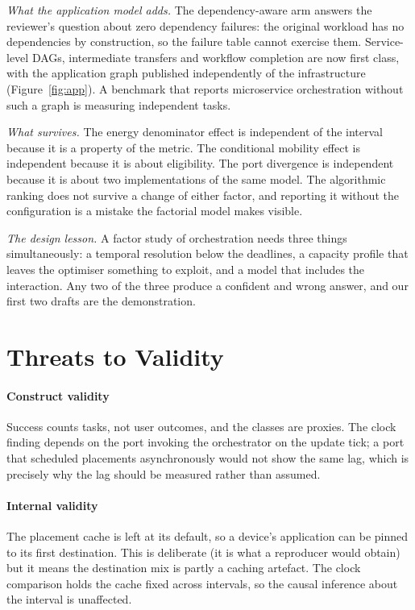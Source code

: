 \documentclass[journal,10pt]{IEEEtran}
\begin{document}
\emph{What the application model adds.} The dependency-aware arm answers the
reviewer's question about zero dependency failures: the original workload has
no dependencies by construction, so the failure table cannot exercise them.
Service-level DAGs, intermediate transfers and workflow completion are now first
class, with the application graph published independently of the infrastructure
(Figure~\ref{fig:app}). A benchmark that reports microservice orchestration
without such a graph is measuring independent tasks.

\emph{What survives.} The energy denominator effect is independent of the
interval because it is a property of the metric. The conditional mobility effect
is independent because it is about eligibility. The port divergence is
independent because it is about two implementations of the same model. The
algorithmic ranking does not survive a change of either factor, and reporting it
without the configuration is a mistake the factorial model makes visible.

\emph{The design lesson.} A factor study of orchestration needs three things
simultaneously: a temporal resolution below the deadlines, a capacity profile
that leaves the optimiser something to exploit, and a model that includes the
interaction. Any two of the three produce a confident and wrong answer, and our
first two drafts are the demonstration.

\section{Threats to Validity}
\label{sec:threats}

\paragraph{Construct validity}
Success counts tasks, not user outcomes, and the classes are proxies. The clock
finding depends on the port invoking the orchestrator on the update tick; a port
that scheduled placements asynchronously would not show the same lag, which is
precisely why the lag should be measured rather than assumed.

\paragraph{Internal validity}
The placement cache is left at its default, so a device's application can be
pinned to its first destination. This is deliberate (it is what a reproducer
would obtain) but it means the destination mix is partly a caching artefact.
The clock comparison holds the cache fixed across intervals, so the causal
inference about the interval is unaffected.
\end{document}
